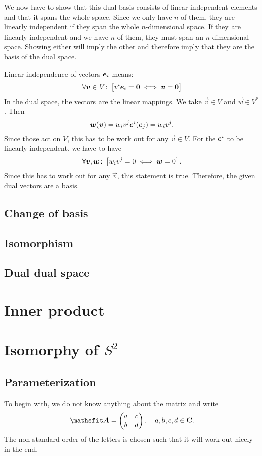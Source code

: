 \documentclass[11pt, english, fleqn, DIV=15, headinclude, BCOR=1cm]{scrartcl}
\begin{document}
We now have to show that this dual basis consists of linear independent
elements and that it spans the whole space. Since we only have $n$ of them,
they are linearly independent if they span the whole $n$-dimensional space. If
they are linearly independent and we have $n$ of them, they must span an
$n$-dimensional space. Showing either will imply the other and therefore imply
that they are the basis of the dual space.

Linear independence of vectors $\boldsymbol{e}_i$ means:
\[
    \forall \boldsymbol{v} \in V \colon 
    \left[ 
        v^i \boldsymbol{e}_i = \boldsymbol{0} \iff \boldsymbol{v} = \boldsymbol{0}
     \right]
\]
In the dual space, the vectors are the linear mappings. We take $\vec v \in V$
and $\vec w \in V^*$. Then
\[
    \boldsymbol{w}(\boldsymbol{v}) = w_i v^j \boldsymbol{e}^i(\boldsymbol{e}_j) = w_i v^j.
\]
Since those act on $V$, this has to be work out for any $\vec v \in V$. For the
$\boldsymbol{e}^i$ to be linearly independent, we have to have
\[
    \forall \boldsymbol{v}, \boldsymbol{w} \colon
    \left[ 
        w_i v^j = 0 \iff \boldsymbol{w} = 0
     \right].
\]
Since this has to work out for any $\vec v$, this statement is true.
Therefore, the given dual vectors are a basis.

\subsection{Change of basis}

\subsection{Isomorphism}

\subsection{Dual dual space}

\section{Inner product}

\section{Isomorphy of $S^2$}

\subsection{Parameterization}

To begin with, we do not know anything about the matrix and write
\[
    \tens A = \begin{pmatrix}
        a & c \\ b & d
    \end{pmatrix}
    \eqnsep
    a, b, c, d \in \C.
\]
The non-standard order of the letters is chosen such that it will work out
nicely in the end.
\end{document}
